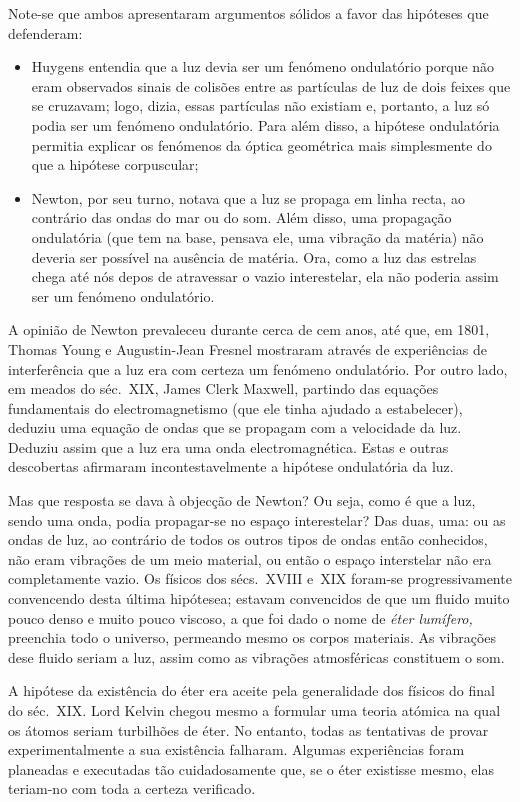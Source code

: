 Note-se
que ambos apresentaram argumentos sólidos a favor das hipóteses que defenderam:
\begin{itemize}
\item
    Huygens entendia que a luz devia ser um fenómeno ondulatório porque não eram
    observados sinais de colisões entre as partículas de luz de dois feixes que
    se cruzavam; logo, dizia, essas partículas não existiam e, portanto, a luz
    só podia ser um fenómeno ondulatório. Para além disso, a hipótese
    ondulatória permitia explicar os fenómenos da óptica geométrica mais
    simplesmente do que a hipótese corpuscular;
\item
    Newton, por seu turno, notava que a luz se propaga em linha recta, ao
    contrário das ondas do mar ou do som. Além disso, uma propagação
    ondulatória (que tem na base, pensava ele, uma vibração da matéria) não
    deveria ser possível na ausência de matéria. Ora, como a luz das estrelas
    chega até nós depos de atravessar o vazio interestelar, ela não poderia
    assim ser um fenómeno ondulatório.
\end{itemize}
A opinião de Newton prevaleceu durante cerca de cem anos, até que, em 1801,
Thomas Young e Augustin-Jean Fresnel mostraram através de experiências de
interferência que a luz era com certeza um fenómeno ondulatório. Por outro
lado, em meados do séc.~XIX, James Clerk Maxwell, partindo das equações
fundamentais do electromagnetismo (que ele tinha ajudado a estabelecer), deduziu
uma equação de ondas que se propagam com a velocidade da luz. Deduziu assim que
a luz era uma onda electromagnética. Estas e outras descobertas afirmaram
incontestavelmente a hipótese ondulatória da luz.

Mas que resposta se dava à objecção de Newton? Ou seja, como é que a luz, sendo
uma onda, podia propagar-se no espaço interestelar? Das duas, uma: ou as ondas
de luz, ao contrário de todos os outros tipos de ondas então conhecidos, não
eram vibrações de um meio material, ou então o espaço interstelar não era
completamente vazio.  Os físicos dos sécs.~XVIII e~XIX foram-se progressivamente
convencendo desta última hipótesea; estavam convencidos  de que um fluido muito
pouco denso e muito pouco viscoso, a que foi dado o nome de \emph{éter
lumífero,} preenchia todo o universo, permeando mesmo os corpos materiais. As
vibrações dese fluido seriam a luz, assim como as vibrações atmosféricas
constituem o som. 

A hipótese da existência do éter era aceite pela generalidade dos físicos do
final do séc.~XIX. Lord Kelvin chegou mesmo a formular uma teoria atómica na
qual os átomos seriam turbilhões de éter. No entanto, todas as tentativas de
provar experimentalmente a sua existência falharam. Algumas experiências foram
planeadas e executadas tão cuidadosamente que, se o éter existisse mesmo, elas
teriam-no com toda a certeza verificado.

